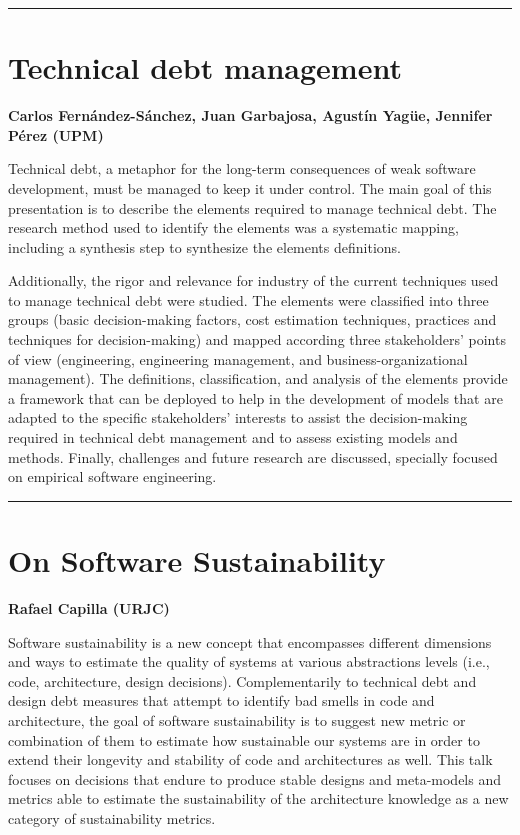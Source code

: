 \documentclass[11pt,pressrelease]{newlfm} %
\begin{document}
\begin{newlfm}
\rule{\textwidth}{1pt} \par \noindent
\section{Technical debt management}

{\bf Carlos Fern\'andez-S\'anchez, Juan Garbajosa, Agust\'in Yagüe, Jennifer P\'erez (UPM)}

Technical debt, a metaphor for the long-term consequences of weak software development, must be managed to keep it under control. The main goal of this presentation is to describe the elements required to manage technical debt. The research method used to identify the elements was a systematic mapping, including a synthesis step to synthesize the elements definitions. 

Additionally, the rigor and relevance for industry of the current techniques used to manage technical debt were studied. The elements were classified into three groups (basic decision-making factors, cost estimation techniques, practices and techniques for decision-making) and mapped according three stakeholders' points of view (engineering, engineering management, and business-organizational management). The definitions, classification, and analysis of the elements provide a framework that can be deployed to help in the development of models that are adapted to the specific stakeholders' interests to assist the decision-making required in technical debt management and to assess existing models and methods. Finally, challenges and future research are discussed, specially focused on empirical software engineering.


\rule{\textwidth}{1pt} \par \noindent
\section{On Software Sustainability}

{\bf Rafael Capilla (URJC)}

Software sustainability is a new concept that encompasses different dimensions and 
ways to estimate the quality of systems at various abstractions levels (i.e., code,
architecture, design decisions). Complementarily to technical debt and design debt
measures that attempt to identify bad smells in code and architecture, the goal
of software sustainability is to suggest new metric or combination of them to estimate
how sustainable our systems are in order to extend their longevity and stability
of code and architectures as well. This talk focuses on decisions that endure to produce
stable designs and meta-models and metrics able to estimate the sustainability of the
architecture knowledge as a new category of sustainability metrics.


\end{newlfm}
\end{document}
